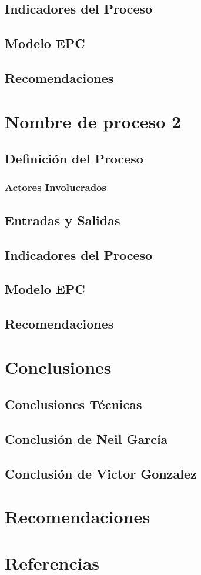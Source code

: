\documentclass[12pt,letterpaper]{article}
\begin{document}
\subsection{Indicadores del Proceso}

\subsection{Modelo EPC}

\subsection{Recomendaciones}

\section{Nombre de proceso 2}

\subsection{Definición del Proceso}

\subsubsection{Actores Involucrados}

\subsection{Entradas y Salidas}

\subsection{Indicadores del Proceso}

\subsection{Modelo EPC}

\subsection{Recomendaciones}

\section{Conclusiones}

\subsection{Conclusiones Técnicas}

\subsection{Conclusión de Neil García}

\subsection{Conclusión de Victor Gonzalez}

\section{Recomendaciones}

\section{Referencias}
\end{document}
